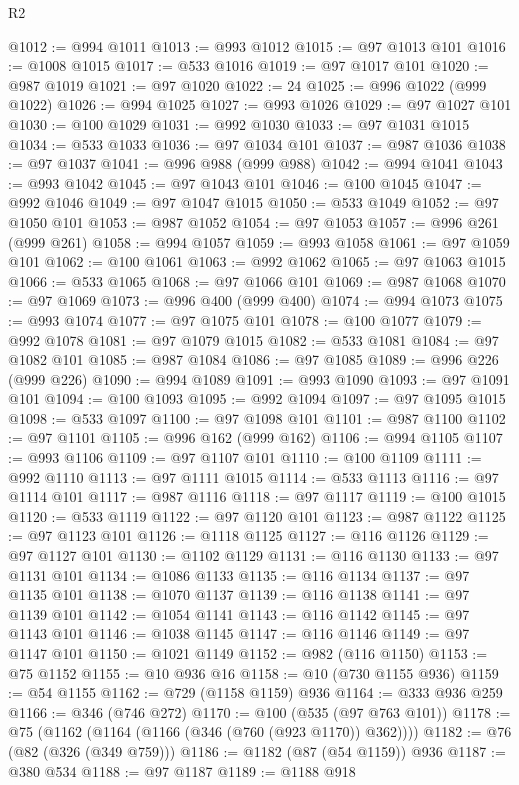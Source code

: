 \begin{lexlean}{R2}
\begin{coremodule}
@1012 := @994 @1011
@1013 := @993 @1012
@1015 := @97 @1013 @101
@1016 := @1008 @1015
@1017 := @533 @1016
@1019 := @97 @1017 @101
@1020 := @987 @1019
@1021 := @97 @1020
@1022 := 24
@1025 := @996 @1022 (@999 @1022)
@1026 := @994 @1025
@1027 := @993 @1026
@1029 := @97 @1027 @101
@1030 := @100 @1029
@1031 := @992 @1030
@1033 := @97 @1031 @1015
@1034 := @533 @1033
@1036 := @97 @1034 @101
@1037 := @987 @1036
@1038 := @97 @1037
@1041 := @996 @988 (@999 @988)
@1042 := @994 @1041
@1043 := @993 @1042
@1045 := @97 @1043 @101
@1046 := @100 @1045
@1047 := @992 @1046
@1049 := @97 @1047 @1015
@1050 := @533 @1049
@1052 := @97 @1050 @101
@1053 := @987 @1052
@1054 := @97 @1053
@1057 := @996 @261 (@999 @261)
@1058 := @994 @1057
@1059 := @993 @1058
@1061 := @97 @1059 @101
@1062 := @100 @1061
@1063 := @992 @1062
@1065 := @97 @1063 @1015
@1066 := @533 @1065
@1068 := @97 @1066 @101
@1069 := @987 @1068
@1070 := @97 @1069
@1073 := @996 @400 (@999 @400)
@1074 := @994 @1073
@1075 := @993 @1074
@1077 := @97 @1075 @101
@1078 := @100 @1077
@1079 := @992 @1078
@1081 := @97 @1079 @1015
@1082 := @533 @1081
@1084 := @97 @1082 @101
@1085 := @987 @1084
@1086 := @97 @1085
@1089 := @996 @226 (@999 @226)
@1090 := @994 @1089
@1091 := @993 @1090
@1093 := @97 @1091 @101
@1094 := @100 @1093
@1095 := @992 @1094
@1097 := @97 @1095 @1015
@1098 := @533 @1097
@1100 := @97 @1098 @101
@1101 := @987 @1100
@1102 := @97 @1101
@1105 := @996 @162 (@999 @162)
@1106 := @994 @1105
@1107 := @993 @1106
@1109 := @97 @1107 @101
@1110 := @100 @1109
@1111 := @992 @1110
@1113 := @97 @1111 @1015
@1114 := @533 @1113
@1116 := @97 @1114 @101
@1117 := @987 @1116
@1118 := @97 @1117
@1119 := @100 @1015
@1120 := @533 @1119
@1122 := @97 @1120 @101
@1123 := @987 @1122
@1125 := @97 @1123 @101
@1126 := @1118 @1125
@1127 := @116 @1126
@1129 := @97 @1127 @101
@1130 := @1102 @1129
@1131 := @116 @1130
@1133 := @97 @1131 @101
@1134 := @1086 @1133
@1135 := @116 @1134
@1137 := @97 @1135 @101
@1138 := @1070 @1137
@1139 := @116 @1138
@1141 := @97 @1139 @101
@1142 := @1054 @1141
@1143 := @116 @1142
@1145 := @97 @1143 @101
@1146 := @1038 @1145
@1147 := @116 @1146
@1149 := @97 @1147 @101
@1150 := @1021 @1149
@1152 := @982 (@116 @1150)
@1153 := @75 @1152
@1155 := @10 @936 @16
@1158 := @10 (@730 @1155 @936)
@1159 := @54 @1155
@1162 := @729 (@1158 @1159) @936
@1164 := @333 @936 @259
@1166 := @346 (@746 @272)
@1170 := @100 (@535 (@97 @763 @101))
@1178 := @75 (@1162 (@1164 (@1166 (@346 (@760 (@923 @1170)) @362))))
@1182 := @76 (@82 (@326 (@349 @759)))
@1186 := @1182 (@87 (@54 @1159)) @936
@1187 := @380 @534
@1188 := @97 @1187
@1189 := @1188 @918

\end{coremodule}
\end{lexlean}
